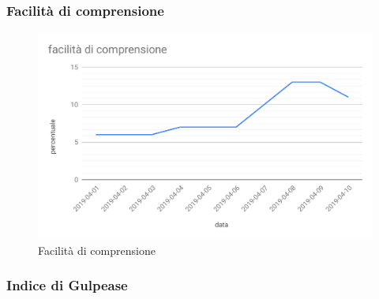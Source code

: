 \subsubsection{Facilità di comprensione} %
\begin{figure}[H]
	\centering
	\includegraphics[scale=0.6]{res/images/RQ/facilita-di-comprensione.pdf}
	\caption{Facilità di comprensione}
\end{figure}

\pagebreak
\subsubsection{Indice di Gulpease}

